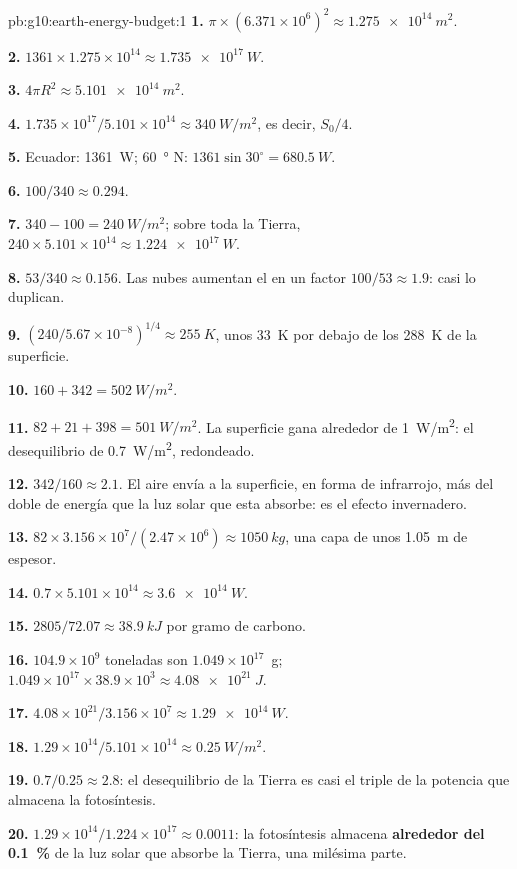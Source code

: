 \begin{solution}{pb:g10:earth-energy-budget:1}
\textbf{1.} $\pi \times (6.371\times10^6)^2 \approx \qty{1.275e14}{m^2}$.

\textbf{2.} $1361 \times 1.275\times10^{14} \approx \qty{1.735e17}{W}$.

\textbf{3.} $4\pi R^2 \approx \qty{5.101e14}{m^2}$.

\textbf{4.} $1.735\times10^{17}/5.101\times10^{14} \approx \qty{340}{W/m^2}$,
es decir, $S_0/4$.

\textbf{5.} Ecuador: \qty{1361}{W}; \qty{60}{\degree} N: $1361 \sin
30^\circ = \qty{680.5}{W}$.

\textbf{6.} $100/340 \approx 0.294$.

\textbf{7.} $340 - 100 = \qty{240}{W/m^2}$; sobre toda la Tierra, $240 \times
5.101\times10^{14} \approx \qty{1.224e17}{W}$.

\textbf{8.} $53/340 \approx 0.156$. Las nubes aumentan el  en un factor
$100/53 \approx 1.9$: casi lo duplican.

\textbf{9.} $(240/5.67\times10^{-8})^{1/4} \approx \qty{255}{K}$, unos
\qty{33}{K} por debajo de los \qty{288}{K} de la superficie.

\textbf{10.} $160 + 342 = \qty{502}{W/m^2}$.

\textbf{11.} $82 + 21 + 398 = \qty{501}{W/m^2}$. La superficie gana alrededor
de \qty{1}{W/m^2}: el desequilibrio de \qty{0.7}{W/m^2}, redondeado.

\textbf{12.} $342/160 \approx 2.1$. El aire envía a la superficie, en forma
de infrarrojo, más del doble de energía que la luz solar que esta absorbe:
es el efecto invernadero.

\textbf{13.} $82 \times 3.156\times10^7/(2.47\times10^6) \approx
\qty{1050}{kg}$, una capa de unos \qty{1.05}{m} de espesor.

\textbf{14.} $0.7 \times 5.101\times10^{14} \approx \qty{3.6e14}{W}$.

\textbf{15.} $2805/72.07 \approx \qty{38.9}{kJ}$ por gramo de carbono.

\textbf{16.} $104.9\times10^9$ toneladas son $1.049\times10^{17}$~g;
$1.049\times10^{17} \times 38.9\times10^3 \approx \qty{4.08e21}{J}$.

\textbf{17.} $4.08\times10^{21}/3.156\times10^7 \approx \qty{1.29e14}{W}$.

\textbf{18.} $1.29\times10^{14}/5.101\times10^{14} \approx
\qty{0.25}{W/m^2}$.

\textbf{19.} $0.7/0.25 \approx 2.8$: el desequilibrio de la Tierra es casi
el triple de la potencia que almacena la fotosíntesis.

\textbf{20.} $1.29\times10^{14}/1.224\times10^{17} \approx 0.0011$: la
fotosíntesis almacena \textbf{alrededor del \qty{0.1}{\percent}} de la luz
solar que absorbe la Tierra, una milésima parte.
\end{solution}
